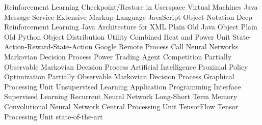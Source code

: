 \begin        {acronym}[Bash]
	       {Reinforcement Learning}
         {Checkpoint/Restore in Userspace}
           {Virtual Machines}
	      {Java Message Service}
	      {Extensive Markup Language}
	     {JavaScript Object Notation}
	   {Deep Reinforcement Learning}
	     {Java Architecture for XML}
	     {Plain Old Java Object}
	     {Plain Old Python Object}
	       {Distribution Utility}
	      {Combined Heat and Power Unit}
	    {State-Action-Reward-State-Action}
	     {Google Remote Process Call}
	       {Neural Networks}
	      {Markovian Decision Process}
	 {Power Trading Agent Competition}
	    {Partially Observable Markovian Decision Process}
	       {Artificial Intelligence}
	      {Proximal Policy Optimization}
	    {Partially Observable Markovian Decision Process}
	      {Graphical Processing Unit}
           {Unsupervised Learning}
          {Application Programming Interface}
           {Supervised Learning}
          {Recurrent Neural Network}
         {Long-Short Term Memory}
          {Convolutional Neural Network}
	      {Central Processing Unit}
	       {TensorFlow}
	      {Tensor Processing Unit}
	     {state-of-the-art}

\end          {acronym}
